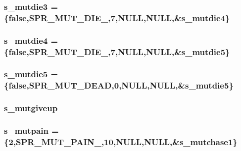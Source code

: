 \label{WL__ACT2_8C_a62e3ae61dabb73967fe34eee93e9ca96}
\hypertarget{WL__ACT2_8C_a2c018e0b0460afd987ad8350890f7086}{
\subsubsection[{s\_\-mutdie3}]{ {\bf s\_\-mutdie3} = \{false,SPR\_\-MUT\_\-DIE\_,7,NULL,NULL,\&{\bf s\_\-mutdie4}\}}}
\label{WL__ACT2_8C_a2c018e0b0460afd987ad8350890f7086}
\hypertarget{WL__ACT2_8C_a0850aed795c6485f08f69e67f4c71190}{
\subsubsection[{s\_\-mutdie4}]{ {\bf s\_\-mutdie4} = \{false,SPR\_\-MUT\_\-DIE\_,7,NULL,NULL,\&{\bf s\_\-mutdie5}\}}}
\label{WL__ACT2_8C_a0850aed795c6485f08f69e67f4c71190}
\hypertarget{WL__ACT2_8C_a9fec43fc0f6b3c9739a2d19440039ba9}{
\subsubsection[{s\_\-mutdie5}]{ {\bf s\_\-mutdie5} = \{false,SPR\_\-MUT\_\-DEAD,0,NULL,NULL,\&{\bf s\_\-mutdie5}\}}}
\label{WL__ACT2_8C_a9fec43fc0f6b3c9739a2d19440039ba9}
\hypertarget{WL__ACT2_8C_aabb630177583a51ba96cd08b82e10694}{
\subsubsection[{s\_\-mutgiveup}]{ {\bf s\_\-mutgiveup}}}
\label{WL__ACT2_8C_aabb630177583a51ba96cd08b82e10694}
\hypertarget{WL__ACT2_8C_a9a4fddc816b63dd2533cb20ce08a0b6b}{
\subsubsection[{s\_\-mutpain}]{ {\bf s\_\-mutpain} = \{2,SPR\_\-MUT\_\-PAIN\_,10,NULL,NULL,\&{\bf s\_\-mutchase1}\}}}

